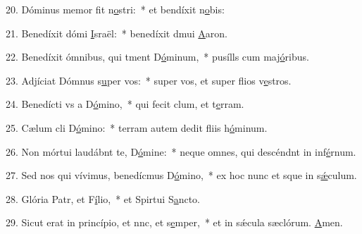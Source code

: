 20. Dóminus memor fit n\uline{o}stri:~* et bendíxit n\uline{o}bis:\par 
21. Benedíxit dómi \uline{I}sraël:~* benedíxit dmui \uline{A}aron.\par 
22. Benedíxit ómnibus, qui tment D\uline{ó}minum,~* pusílls cum maj\uline{ó}ribus.\par 
23. Adjíciat Dómnus s\uline{u}per vos:~* super vos, et super flios v\uline{e}stros.\par 
24. Benedícti vs a D\uline{ó}mino,~* qui fecit clum, et t\uline{e}rram.\par 
25. Cælum cli D\uline{ó}mino:~* terram autem dedit fliis h\uline{ó}minum.\par 
26. Non mórtui laudábnt te, D\uline{ó}mine:~* neque omnes, qui descéndnt in inf\uline{é}rnum.\par 
27. Sed nos qui vívimus, benedícmus D\uline{ó}mino,~* ex hoc nunc et sque in s\uline{ǽ}culum.\par 
28. Glória Patr, et F\uline{í}lio,~* et Spirtui S\uline{a}ncto.\par 
29. Sicut erat in princípio, et nnc, et s\uline{e}mper,~* et in sǽcula sæclórum. \uline{A}men.\par 
